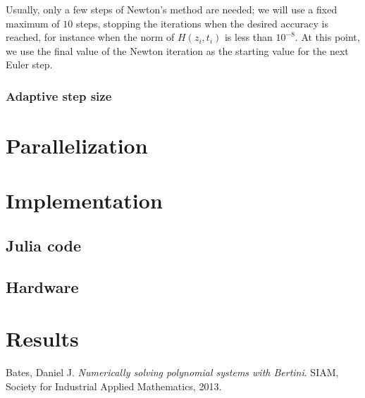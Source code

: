 \documentclass[a4paper]{article}
\theoremstyle{definition}
\theoremstyle{definition}
\theoremstyle{remark}
\theoremstyle{definition}
\begin{document}
Usually, only a few steps of Newton's method are needed; we will use a fixed maximum of $10$ steps,
stopping the iterations when the desired accuracy is reached, for instance when the norm of $H(z_i,t_i)$ is less than $10^{-8}$.
At this point, we use the final value of the Newton iteration as the starting value for the next Euler step.
\subsubsection{Adaptive step size}

\section{Parallelization}

\section{Implementation}
\subsection{Julia code}
\subsection{Hardware}

\section{Results}

 Bates, Daniel J. \textit{Numerically solving polynomial systems with Bertini}. SIAM, Society for Industrial Applied Mathematics, 2013.
\end{document}
